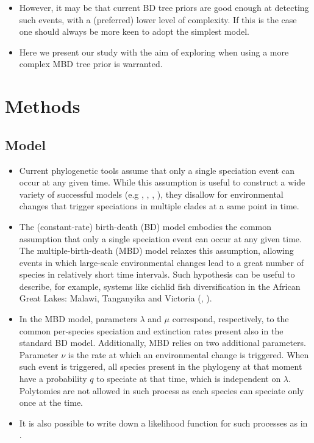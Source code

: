 \documentclass{article}
\begin{document}
\begin{itemize}
\item However, it may be that current BD tree priors are good enough at detecting such events, with a (preferred) lower level of complexity. If this is the case one should always be more keen to adopt the simplest model.

\item Here we present our study with the aim of exploring when using a more complex MBD tree prior is warranted.

\end{itemize}

\section{Methods}

\subsection{Model}
\begin{itemize}

\item Current phylogenetic tools assume that only a single speciation event can occur at any given time.
While this assumption is useful to construct a wide variety of successful 
models (e.g \cite{Maddison2007biSSE}, \cite{Valente2015}, \cite{etienne2012diversity}, \cite{etienne2014estimating}),
they disallow for environmental changes that trigger speciations in multiple clades at a same point in time. 

\item The (constant-rate) birth-death (BD) model embodies the common assumption that 
only a single speciation event can occur at any given time.
The multiple-birth-death (MBD) model relaxes this assumption, allowing events in which 
large-scale environmental changes lead to a great number of species 
in relatively short time intervals. Such hypothesis can be useful to describe, for example, 
systems like cichlid fish diversification in the 
African Great Lakes: Malawi, Tanganyika and Victoria (\cite{janzen2016}, \cite{janzen2017}).

\item In the MBD model, parameters $\lambda$ and $\mu$ correspond, respectively, 
to the common per-species speciation and extinction rates present also in the standard BD model. 
Additionally, MBD relies on two additional parameters. Parameter $\nu$ is the rate at which an environmental change is triggered.
When such event is triggered, all species present in the phylogeny at that moment
have a probability $q$ to speciate at that time, which is 
independent on $\lambda$. Polytomies are not allowed in such process as each species can speciate only once at the time.

\item It is also possible to write down a likelihood function for such processes as in \cite{mbd}.
    
\end{itemize}
\end{document}
